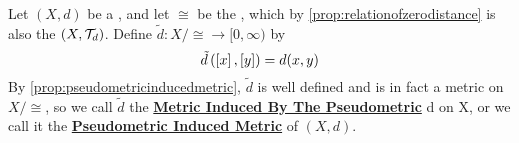 
\newcommand{\PseudometricInducedMetric}[0]{\textbf{\hyperref[def:pseudometricinducedmetric]{Pseudometric Induced Metric}}\xspace}
\newcommand{\MetricInducedByPseudometric}[0]{\textbf{\hyperref[def:pseudometricinducedmetric]{Metric Induced By The Pseudometric}}\xspace}
\begin{df}
    \label{def:pseudometricinducedmetric}
    Let $(X,d)$ be a \PseudometricSpace, and let $\cong$ be the \RelationOfZeroDistance, which by \ref{prop:relationofzerodistance} is also the \RelationOfEqualNeighborhoodFilters $(X,\mathcal{T}_d)$. 
    Define $\tilde{d}: X/\cong \to [0,\infty)$ by 
    \begin{equation}
        \tilde{d}\left( \left[ x \right], \left[ y \right]\right) = d(x,y)
    \end{equation}
    By \ref{prop:pseudometricinducedmetric}, $\tilde{d}$ is well defined and is in fact a metric on $X/\cong$, so we call $\tilde{d}$ the \MetricInducedByPseudometric d on X, or we call it the \PseudometricInducedMetric of $(X,d)$. 
\end{df}
